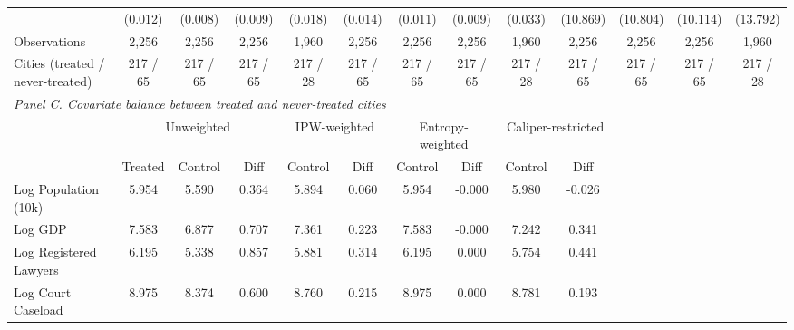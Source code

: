 \begin{table}[!htbp]
\begin{threeparttable}
\begin{tabular}{l*{12}{c}}
& (0.012) & (0.008) & (0.009) & (0.018) & (0.014) & (0.011) & (0.009) & (0.033) & (10.869) & (10.804) & (10.114) & (13.792) \\
\addlinespace
Observations & 2,256 & 2,256 & 2,256 & 1,960 & 2,256 & 2,256 & 2,256 & 1,960 & 2,256 & 2,256 & 2,256 & 1,960 \\
Cities (treated / never-treated) & 217 / 65 & 217 / 65 & 217 / 65 & 217 / 28 & 217 / 65 & 217 / 65 & 217 / 65 & 217 / 28 & 217 / 65 & 217 / 65 & 217 / 65 & 217 / 28 \\
\midrule
\multicolumn{13}{l}{\textit{Panel C. Covariate balance between treated and never-treated cities}} \\
\addlinespace
 & \multicolumn{3}{c}{Unweighted} & \multicolumn{2}{c}{IPW-weighted} & \multicolumn{2}{c}{Entropy-weighted} & \multicolumn{2}{c}{Caliper-restricted} & \multicolumn{2}{c}{} \\
\cmidrule(lr){2-4}\cmidrule(lr){5-6}\cmidrule(lr){7-8}\cmidrule(lr){9-10}
 & Treated & Control & Diff & Control & Diff & Control & Diff & Control & Diff & & \\
\midrule
Log Population (10k) & 5.954 & 5.590 & 0.364 & 5.894 & 0.060 & 5.954 & -0.000 & 5.980 & -0.026 & & & \\
Log GDP & 7.583 & 6.877 & 0.707 & 7.361 & 0.223 & 7.583 & -0.000 & 7.242 & 0.341 & & & \\
Log Registered Lawyers & 6.195 & 5.338 & 0.857 & 5.881 & 0.314 & 6.195 & 0.000 & 5.754 & 0.441 & & & \\
Log Court Caseload & 8.975 & 8.374 & 0.600 & 8.760 & 0.215 & 8.975 & 0.000 & 8.781 & 0.193 & & & \\
\bottomrule
\end{tabular}
\begin{tablenotes}[flushleft]
\footnotesize

\end{tablenotes}
\end{threeparttable}
\end{table}
